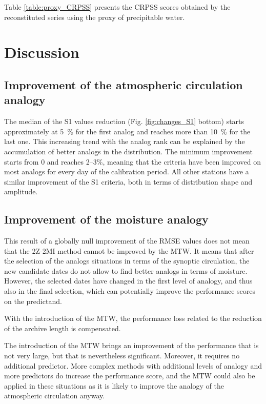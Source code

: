 \documentclass[hess, manuscript]{copernicus}
\begin{document}
Table \ref{table:proxy_CRPSS} presents the CRPSS scores obtained by the reconstituted series using the proxy of precipitable water.


\section{Discussion}
\label{sec:discussion}


\subsection{Improvement of the atmospheric circulation analogy}

The median of the S1 values reduction (Fig. \ref{fig:changes_S1} bottom) starts approximately at 5~\% for the first analog and reaches more than 10~\% for the last one. This increasing trend with the analog rank can be explained by the accumulation of better analogs in the distribution. The minimum improvement starts from 0 and reaches 2--3\%, meaning that the criteria have been improved on most analogs for every day of the calibration period. All other stations have a similar improvement of the S1 criteria, both in terms of distribution shape and amplitude.


\subsection{Improvement of the moisture analogy}




This result of a globally null improvement of the RMSE values does not mean that the 2Z-2MI method cannot be improved by the MTW. It means that after the selection of the analogs situations in terms of the synoptic circulation, the new candidate dates do not allow to find better analogs in terms of moisture. However, the selected dates have changed in the first level of analogy, and thus also in the final selection, which can potentially improve the performance scores on the predictand.




With the introduction of the MTW, the performance loss related to the reduction of the archive length is compensated.



The introduction of the MTW brings an improvement of the performance that is not very large, but that is nevertheless significant. Moreover, it requires no additional predictor. More complex methods with additional levels of analogy and more predictors do increase the performance score, and the MTW could also be applied in these situations as it is likely to improve the analogy of the atmospheric circulation anyway. 
\end{document}
